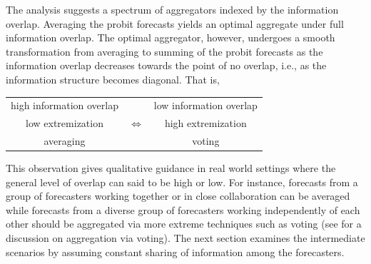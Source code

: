 \documentclass[11pt]{article}
\newtheorem{observation}[theorem]{Observation}
\newtheorem{proposition}[theorem]{Proposition}
\theoremstyle{definition}
\theoremstyle{definition}
\begin{document}
The analysis suggests a spectrum of aggregators indexed by the 
information overlap.  Averaging the probit forecasts yields an 
optimal aggregate under full information overlap.  The optimal 
aggregator, however, undergoes a smooth transformation from 
averaging to summing of the probit forecasts as the information 
overlap decreases towards the point of no overlap, i.e., as the 
information structure becomes diagonal.  
That is,
\begin{center}
\begin{tabular}{ccc}
high information overlap & & low information overlap\\
low extremization & {\Large $\Longleftrightarrow$} & high extremization \\
averaging  & & voting\\
\end{tabular}
\end{center}
This observation gives qualitative
guidance in real world settings where the general level of overlap 
can said to be high or low.  For instance, forecasts from a group 
of forecasters working together or in close collaboration can be 
averaged while forecasts from a diverse group of forecasters working 
independently of each other should be aggregated via more extreme 
techniques such as voting (see \citet{parunak2013characterizing} 
for a discussion on aggregation via voting). The next section examines the intermediate scenarios by assuming constant sharing of information among the forecasters. 

%
\end{document}
